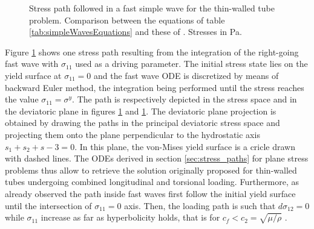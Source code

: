 \begin{figure}[h!]
  \centering
   \qquad
  \caption{Stress path followed in a fast simple wave for the thin-walled tube problem. Comparison between the equations of table \ref{tab:simpleWavesEquations} and these of \cite{Clifton}. Stresses in Pa.}
  \label{fig:fast_clifton}
\end{figure}
Figure \ref{fig:fast_clifton} shows one stress path resulting from the integration of the right-going fast wave with $\sigma_{11}$ used as a driving parameter.
The initial stress state lies on the yield surface at $\sigma_{11}=0$ and the fast wave ODE is discretized by means of backward Euler method, the integration being performed until the stress reaches the value $\sigma_{11}=\sigma^y$.
The path is respectively depicted in the stress space and in the deviatoric plane in figures \ref{fig:fast_clifton} and \ref{fig:fast_clifton}.
The deviatoric plane projection is obtained by drawing the paths in the principal deviatoric stress space and projecting them onto the plane perpendicular to the hydrostatic axis $s_1+s_2+s-3=0$.
In this plane, the von-Mises yield surface is a cricle drawn with dashed lines.
The ODEs derived in section \ref{sec:stress_paths} for plane stress problems thus allow to retrieve the solution originally proposed for thin-walled tubes undergoing combined longitudinal and torsional loading.
Furthermore, as already observed the path inside fast waves first follow the initial yield surface until the intersection of $\sigma_{11}=0$ axis.
Then, the loading path is such that $d\sigma_{12}=0$ while $\sigma_{11}$ increase as far as hyperbolicity holds, that is for $c_f < c_2 = \sqrt{\mu/\rho}$ \cite{Clifton}.

